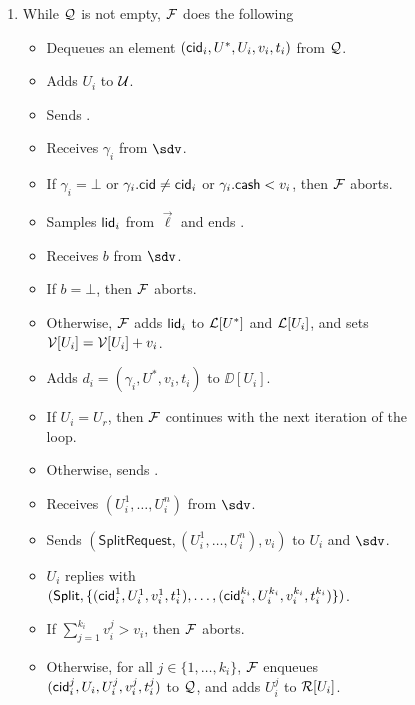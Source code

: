 \begin{figure*}[!t]
{{\begin{enumerate}
	\item While $\mathcal{Q}$ is not empty, $\mathcal{F}$ does the following
	\begin{itemize}[label=-]
		\item Dequeues an element $(\mathsf{cid}_i,U^*,U_i,v_i,t_i)$ from $\mathcal{Q}$.
		\item Adds $U_i$ to $\mathcal{U}$.
		\item Sends .
		\item Receives $\gamma_i$ from $\sdv$.
		\item If $\gamma_i = \bot$ or $\gamma_i.\mathsf{cid} \neq \mathsf{cid}_i$ or $\gamma_i.\mathsf{cash} < v_i$, 
		then $\mathcal{F}$ aborts.
		\item Samples $\mathsf{lid}_i$ from $\vec{\ell}$ and ends .
		\item Receives $b$ from $\sdv$.
		\item If $b = \bot$, then $\mathcal{F}$ aborts.
		\item Otherwise, $\mathcal{F}$ adds $\mathsf{lid}_i$ to $\mathcal{L}[U^*]$ and $\mathcal{L}[U_i]$, and sets $\mathcal{V}[U_i] = 
		\mathcal{V}[U_i] + v_i$.
		\item Adds $d_i = (\gamma_i,U^*,v_i,t_i)$ to $\DD[U_i]$.
		\item If $U_i = U_r$, then $\mathcal{F}$ continues with the next iteration of the loop.
		\item Otherwise, sends .
		\item Receives $(U_i^1,\ldots,U_i^n)$ from $\sdv$.
		\item Sends $(\mathsf{SplitRequest}, (U_i^1,\ldots,U_i^n), v_i)$ to $U_i$ 
		and $\sdv$.
		\item $U_i$ replies with $(\mathsf{Split}, \{(\mathsf{cid}_i^1,U_i^1,v_i^1,t_i^1),\ldots,
		(\mathsf{cid}_i^{k_i},U_i^{k_i},v_i^{k_i},t_i^{k_i})\})$.
		\item If $\textstyle\sum_{j = 1}^{k_i} v_i^j > v_i$, then $\mathcal{F}$ aborts.
		\item Otherwise, for all $j \in \{1,\ldots,k_i\}$, $\mathcal{F}$ enqueues 
		$(\mathsf{cid}_i^j,U_i,U_i^j,v_i^j,t_i^j)$ to $\mathcal{Q}$, and adds $U_i^j$ to $\mathcal{R}[U_i]$.
	\end{itemize}
	

\end{enumerate}}}
\end{figure*}
